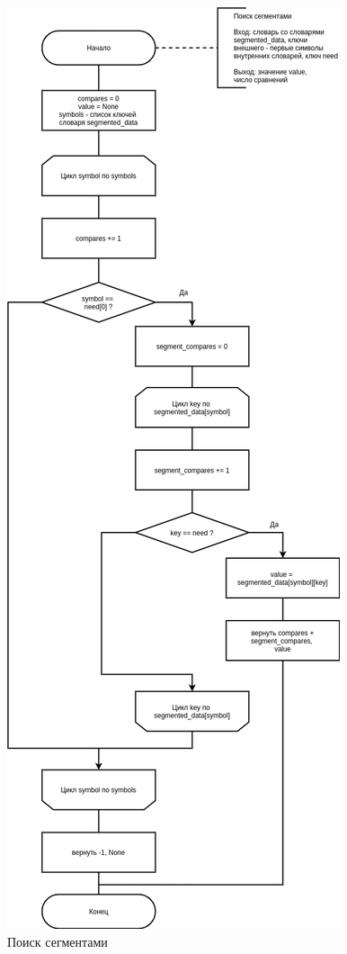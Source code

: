 \begin{figure}[H]
	\begin{center}
		\includegraphics[scale=0.4]{img/segment.png}
	\end{center}
	\captionsetup{justification=centering}
	\caption{Поиск сегментами}
	\label{img:segment}
\end{figure}

